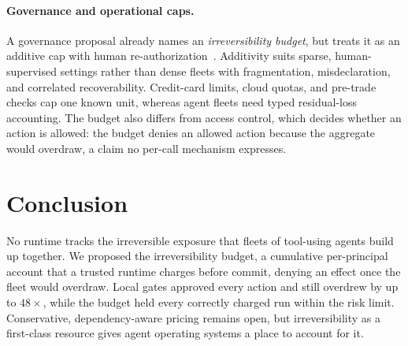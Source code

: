 \documentclass[sigconf]{acmart}
\begin{document}
\paragraph{Governance and operational caps.} A governance proposal already names an \emph{irreversibility budget}, but treats it as an additive cap with human re-authorization~\cite{Sahoo2026Controllability}. Additivity suits sparse, human-supervised settings rather than dense fleets with fragmentation, misdeclaration, and correlated recoverability. Credit-card limits, cloud quotas, and pre-trade checks cap one known unit, whereas agent fleets need typed residual-loss accounting. The budget also differs from access control, which decides whether an action is allowed: the budget denies an allowed action because the aggregate would overdraw, a claim no per-call mechanism expresses.

\section{Conclusion}
No runtime tracks the irreversible exposure that fleets of tool-using agents build up together. We proposed the irreversibility budget, a cumulative per-principal account that a trusted runtime charges before commit, denying an effect once the fleet would overdraw. Local gates approved every action and still overdrew by up to $48\times$, while the budget held every correctly charged run within the risk limit. Conservative, dependency-aware pricing remains open, but irreversibility as a first-class resource gives agent operating systems a place to account for it.

\balance


\end{document}
